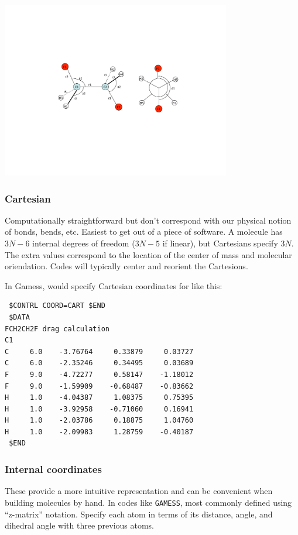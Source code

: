 \documentclass[11pt]{article}
\begin{document}
\begin{center}
\begin{center}
\includegraphics[width=0.75\textwidth]{./Images/Internals.pdf}
\end{center}
\end{center}

\subsubsection{Cartesian}
\label{sec:org814d3a9}
Computationally straightforward but don't correspond with our physical notion of bonds,
bends, etc.  Easiest to get out of a piece of software.  A molecule has \(3 N-6\) internal degrees of freedom (\(3N-5\) if linear), but Cartesians specify \(3N\).  The extra values correspond to the location of the center of mass and molecular oriendation.  Codes will typically center and reorient the Cartesions.

In Gamess, would specify Cartesian coordinates for  like this:
\begin{verbatim}
 $CONTRL COORD=CART $END
 $DATA
FCH2CH2F drag calculation
C1
C     6.0    -3.76764     0.33879     0.03727
C     6.0    -2.35246     0.34495     0.03689
F     9.0    -4.72277     0.58147    -1.18012
F     9.0    -1.59909    -0.68487    -0.83662
H     1.0    -4.04387     1.08375     0.75395
H     1.0    -3.92958    -0.71060     0.16941
H     1.0    -2.03786     0.18875     1.04760
H     1.0    -2.09983     1.28759    -0.40187
 $END
\end{verbatim}
\subsubsection{Internal coordinates}
\label{sec:org388f71e}
These provide a more intuitive representation and can be convenient when building molecules by hand.  In codes like \texttt{GAMESS}, most commonly defined using ``z-matrix'' notation. Specify  each atom in terms of its distance, angle, and dihedral angle with three previous atoms.
\end{document}
